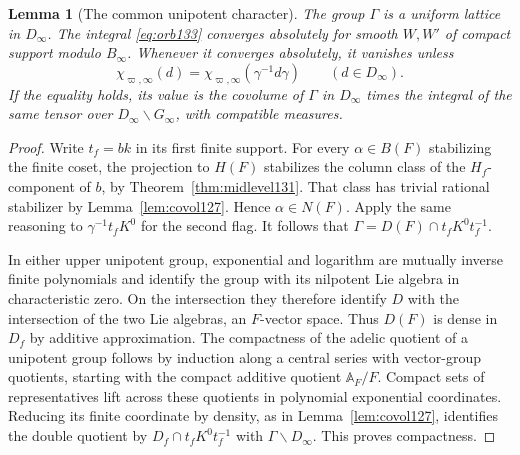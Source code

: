 \documentclass[a4paper,11pt]{article}
\newtheorem{lemma}[proposition]{Lemma}
\theoremstyle{definition}
\theoremstyle{remark}
\numberwithin{equation}{section}
\begin{document}
\begin{lemma}[The common unipotent character]\label{lem:zero133}
The group \(\Gamma\) is a uniform lattice in \(D_\infty\).
The integral \eqref{eq:orb133} converges absolutely for smooth
\(W,W'\) of compact support modulo \(B_\infty\).
Whenever it converges absolutely, it vanishes unless
\begin{equation}
     \chi_{\varpi,\infty}(d)=
        \chi_{\varpi,\infty}(\gamma^{-1}d\gamma)
                   \qquad(d\in D_\infty).
     \label{eq:relevant133}
\end{equation}
If the equality holds, its value is the covolume of \(\Gamma\)
in \(D_\infty\) times the integral of the same tensor over
\(D_\infty\backslash G_\infty\), with compatible measures.
\end{lemma}
\begin{proof}
Write \(t_f=bk\) in its first finite support. For every
\(\alpha\in B(F)\) stabilizing the finite coset, the projection
to \(H(F)\) stabilizes the column class of the \(H_f\)-component
of \(b\), by Theorem~\ref{thm:midlevel131}. That class has
trivial rational stabilizer by Lemma~\ref{lem:covol127}.
Hence \(\alpha\in N(F)\). Apply the same reasoning to
\(\gamma^{-1}t_fK^0\) for the second flag. It follows that
\(\Gamma=D(F)\cap t_fK^0t_f^{-1}\).

In either upper unipotent group, exponential and logarithm are
mutually inverse finite polynomials and identify the group with
its nilpotent Lie algebra in characteristic zero. On the
intersection they therefore identify \(D\) with the intersection
of the two Lie algebras, an \(F\)-vector space. Thus \(D(F)\) is
dense in \(D_f\) by additive approximation. The compactness of
the adelic quotient of a unipotent group follows by induction
along a central series with vector-group quotients, starting
with the compact additive quotient \(\mathbb A_F/F\). Compact
sets of representatives lift across these quotients in polynomial
exponential coordinates. Reducing its finite coordinate by
density, as in Lemma~\ref{lem:covol127}, identifies the double
quotient by \(D_f\cap t_fK^0t_f^{-1}\) with
\(\Gamma\backslash D_\infty\). This proves compactness.


\end{proof}
\end{document}
